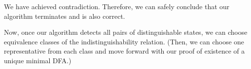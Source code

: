 \documentclass[english, 11pt]{article}
\begin{document}
\begin{figure}[htbp]
    \begin{subfigure}{0.45\textwidth}
        \begin{center}
            \label{fig:2sta1}
        \end{center}
    \end{subfigure}
    \hspace{1cm} %
    \begin{subfigure}{0.45\textwidth}
        \begin{center}
            \label{fig:2sta2}
        \end{center}
    \end{subfigure}
    \label{fig:2sta}
\end{figure}


We have achieved contradiction. Therefore, we can safely conclude that our algorithm terminates and is also correct.


Now, once our algorithm detects all pairs of distinguishable states, we can choose equivalence classes of the indistinguishability relation. (Then, we can choose one representative from each class and move forward with our proof of existence of a unique minimal DFA.)
\end{document}
